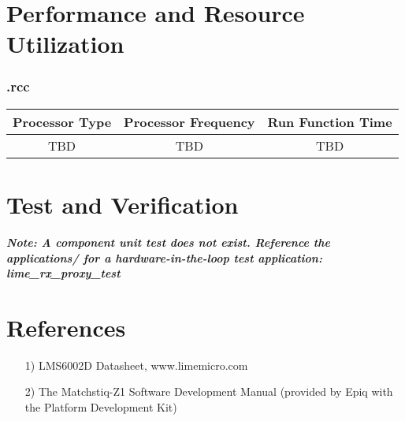 \section*{Performance and Resource Utilization}
\subsubsection*{\comp.rcc}
\begin{scriptsize}
	\begin{tabular}{|c|c|c|}
		\hline
		\rowcolor{blue}
		Processor Type & Processor Frequency & Run Function Time \\
		\hline
		TBD            & TBD                 & TBD               \\
		\hline
	\end{tabular}
\end{scriptsize}

\section*{Test and Verification}

\textit{\textbf{Note: A component unit test does not exist.  Reference the applications/ for a hardware-in-the-loop test application: lime\_rx\_proxy\_test}}

\section*{References}
\begin{itemize}
	\item[1)] LMS6002D Datasheet, www.limemicro.com
	\item[2)] The Matchstiq-Z1 Software Development Manual (provided by Epiq with the Platform Development Kit)
\end{itemize}


